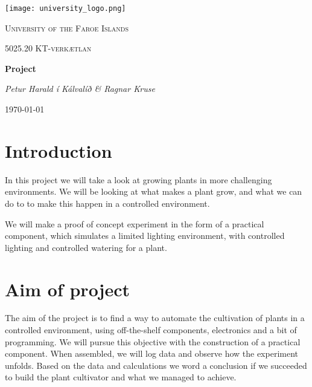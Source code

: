 \documentclass[12pt,a4paper,oneside]{book}
\newcommand{\newHeadline}{University of the Faroe Islands} %
\newcommand{\newTitle}{Project} %
\newcommand{\newAuthor}{Petur Harald í Kálvalíð \& Ragnar Kruse} %
\newcommand{\newKeywords}{5025.20 KT-verkætlan} %
\newcommand{\newDate}{\today} %
\begin{document}
\makeatletter
\begin{titlepage}
        \centering
        \texttt{[image: university\_logo.png]} \par \vspace{1cm}
    {\scshape \LARGE \newHeadline \par}
    \vspace{1cm}
    {\scshape \Large \newKeywords \par}
    \vspace{1.5cm}
    {\huge \bfseries \newTitle \par}
    \vspace{2cm}
    {\Large \itshape \newAuthor \par}
    \vfill
    {\large \newDate \par}
\end{titlepage}
\makeatother

\frontmatter

\cleardoublepage{}
\tableofcontents

\mainmatter

\chapter{Introduction}
In this project we will take a look at growing plants in more challenging environments. We will be looking at what makes a plant grow, and what we can do to to make this happen in a controlled environment.

We will make a proof of concept experiment in the form of a practical component, which simulates a limited lighting environment, with controlled lighting and controlled watering for a plant.

\chapter{Aim of project}
The aim of the project is to find a way to automate the cultivation of plants in a controlled environment, using off-the-shelf components, electronics and a bit of programming. We will pursue this objective with the construction of a practical component. When assembled, we will log data and observe how the experiment unfolds.
Based on the data and calculations we word a conclusion if we succeeded to build the plant cultivator and what we managed to achieve.
\end{document}

